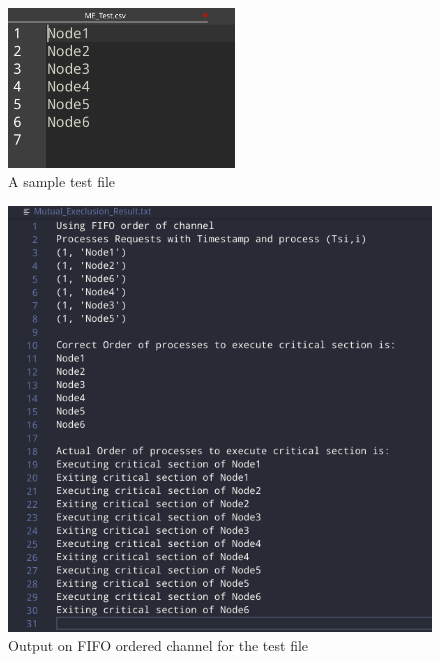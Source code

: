 \documentclass[a4paper, 12pt]{article}
\begin{document}
			\begin{figure}[H]
				\centering
					\includegraphics[width=60mm]{ME_Test.png}
					\caption{A sample test file}
					\label{METest}
			\end{figure}
		
			\begin{figure}[H]
				\includegraphics[width=\linewidth]{ME_FIFO.png}
				\caption{Output on FIFO ordered channel for the test file}
				\label{MEResF}
			\end{figure}
		
\end{document}

